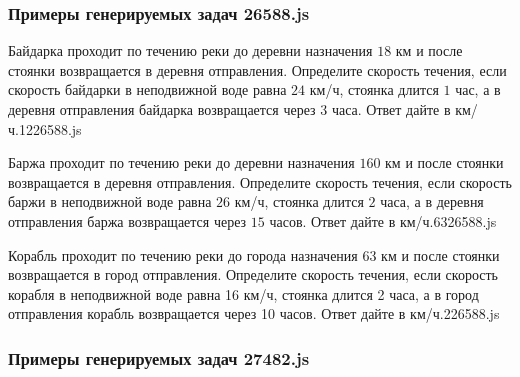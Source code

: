 
\subsubsection*{Примеры генерируемых задач 26588.js}   

\par{Байдарка проходит по течению реки до деревни назначения $18$ км и после стоянки возвращается в деревня отправления. Определите скорость течения, если скорость байдарки в неподвижной воде равна $24$ км/ч, стоянка длится $1$ час, а в деревня отправления байдарка возвращается через $3$ часа. Ответ дайте в км/ч.}{12}{26588.js}
\par{Баржа проходит по течению реки до деревни назначения $160$ км и после стоянки возвращается в деревня отправления. Определите скорость течения, если скорость баржи в неподвижной воде равна $26$ км/ч, стоянка длится $2$ часа, а в деревня отправления баржа возвращается через $15$ часов. Ответ дайте в км/ч.}{6}{326588.js}
\par{Корабль проходит по течению реки до города назначения 63 км и после стоянки возвращается в город отправления. Определите скорость течения, если скорость корабля в неподвижной воде равна 16 км/ч, стоянка длится 2 часа, а в город отправления корабль возвращается через 10 часов. Ответ дайте в км/ч.}{2}{26588.js}


\subsubsection*{Примеры генерируемых задач 27482.js}   

